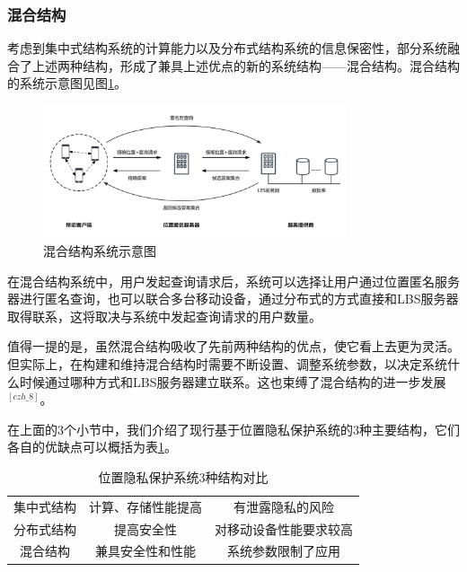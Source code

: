 \documentclass[zihao=-4]{ctexart}
\begin{document}
\subsubsection{混合结构}
考虑到集中式结构系统的计算能力以及分布式结构系统的信息保密性，部分系统融合了上述两种结构，形成了兼具上述优点的新的系统结构——混合结构。混合结构的系统示意图见图\ref{混合结构}。
\begin{figure}[H] %
	\centering %
	\includegraphics[width=0.8\textwidth]{./include_picture/混合结构（绪论-研究现状）} %
	\caption{混合结构系统示意图} %
	\label{混合结构} %
\end{figure}

在混合结构系统中，用户发起查询请求后，系统可以选择让用户通过位置匿名服务器进行匿名查询，也可以联合多台移动设备，通过分布式的方式直接和LBS服务器取得联系，这将取决与系统中发起查询请求的用户数量。
\par
值得一提的是，虽然混合结构吸收了先前两种结构的优点，使它看上去更为灵活。但实际上，在构建和维持混合结构时需要不断设置、调整系统参数，以决定系统什么时候通过哪种方式和LBS服务器建立联系。这也束缚了混合结构的进一步发展$^{[czh\_8]}$。
\par \par 
在上面的3个小节中，我们介绍了现行基于位置隐私保护系统的3种主要结构，它们各自的优缺点可以概括为表\ref{3种结构对比}。


\begin{table}[H]
	\caption{位置隐私保护系统3种结构对比}
	\centering
	\label{3种结构对比}
	\begin{tabular}{ccc}
		\hline  
		\makebox[0.1\textwidth][c]{结构名称} & \makebox[0.4\textwidth][c]{优点} & \makebox[0.4\textwidth][c]{缺点}  \\ 
		\hline  
		集中式结构	&	计算、存储性能提高	&	有泄露隐私的风险\\
		分布式结构	&	提高安全性		   &	对移动设备性能要求较高\\
		混合结构	 &	兼具安全性和性能	 & 		系统参数限制了应用\\
		\hline
	\end{tabular} 
\end{table} 
\end{document}
